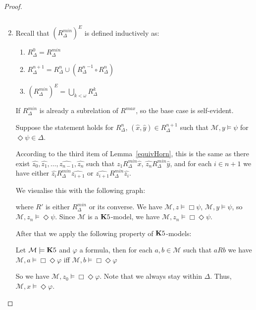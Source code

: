 \documentclass[a4paper]{article}
\theoremstyle{defin}
\theoremstyle{theorem}
\theoremstyle{prop}
\theoremstyle{lemma}
\theoremstyle{fact}
\theoremstyle{ex}
\theoremstyle{col}
\theoremstyle{claim}
\begin{document}
\begin{proof}
\begin{enumerate}
  $ $

  \item Recall that $(R^{min}_{\Delta})^{E}$ is defined inductively as:
  \begin{enumerate}
    \item $R_{\Delta}^{0} = R_{\Delta}^{min}$
    \item $R_{\Delta}^{n + 1} = R_{\Delta}^{n} \cup ({R_{\Delta}^{n}}^{-1} \circ R_{\Delta}^{n})$
    \item $(R^{min}_{\Delta})^{E} = \bigcup_{k < \omega} R_{\Delta}^{k}$
  \end{enumerate}

  If $R^{min}_{\Delta}$ is already a subrelation of $R^{max}$, so the base case is self-evident.

  Suppose the statement holds for $R_{\Delta}^{n}$, $(\hat{x},\hat{y}) \in R_{\Delta}^{n + 1}$ such that $\mathcal{M}, y \models \psi$ for $\Diamond \psi \in \Delta$.

  According to the third item of Lemma~\ref{equivHorn}, this is the same as there exist $\widehat{z_0}, \widehat{z_1}, \dots, \widehat{z_{n-1}}, \widehat{z_n}$ such that
  $\widehat{z_1} R^{min}_{\Delta} \hat{x}$, $\widehat{z_n} R^{min}_{\Delta} \hat{y}$, and for each $i \in n + 1$ we have either $\widehat{z_i} R^{min}_{\Delta} \widehat{z_{i + 1}}$ or $\widehat{z_{i + 1}} R^{min}_{\Delta} \widehat{z_i}$.

  We visualise this with the following graph:

  where $R'$ is either $R_{\Delta}^{min}$ or its converse. We have $\mathcal{M}, z \models \Box \psi$, $\mathcal{M}, y \models \psi$, so $\mathcal{M}, z_{n} \models \Diamond \psi$. Since $\mathcal{M}$ is a ${\bf K}5$-model, we have $\mathcal{M}, z_{n} \models \Box \Diamond \psi$.

  After that we apply the following property of ${\bf K}5$-models:
  \begin{center}
    Let $\mathcal{M} \models {\bf K}5$ and $\varphi$ a formula, then for each $a, b \in \mathcal{M}$ such that $a R b$ we have $\mathcal{M}, a \models \Box \Diamond \varphi$ iff $\mathcal{M}, b \models \Box \Diamond \varphi$
  \end{center}
  So we have $\mathcal{M}, z_0 \models \Box \Diamond \varphi$. Note that we always stay within $\Delta$. Thus, $\mathcal{M}, x \models \Diamond \varphi$.


\end{enumerate}
\end{proof}
\end{document}
